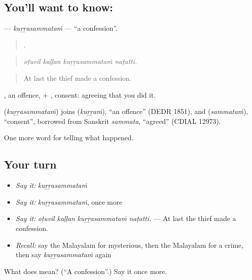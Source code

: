 \subsection*{You'll want to know: }
\textbf{} — \emph{kuṟṟasammataṁ} — \textquotedblleft{}a confession\textquotedblright{}.

\begin{quote}
   .
\end{quote}

\begin{quote}
\emph{oṭuvil kaḷḷan kuṟṟasammataṁ naṭatti.}
\end{quote}

\begin{quote}
At last the thief made a confession.
\end{quote}

, an offence, + , consent: agreeing that you did it.

\begin{cousinweb}
\textbf{} (\emph{kuṟṟasammataṁ}) joins  (\emph{kuṟṟaṁ}), \textquotedblleft{}an offence\textquotedblright{} (DEDR 1851), and  (\emph{sammataṁ}), \textquotedblleft{}consent\textquotedblright{}, borrowed from Sanskrit \emph{sammata}, \textquotedblleft{}agreed\textquotedblright{} (CDIAL 12973).
\end{cousinweb}

\begin{grammarlens}[title={What you've built}]
One more word for telling what happened.
\end{grammarlens}

\subsection*{Your turn}
\begin{itemize}
\raggedright
  \item \emph{Say it:} \emph{kuṟṟasammataṁ}
  \item \emph{Say it:} \emph{kuṟṟasammataṁ}, once more
  \item \emph{Say it:} \emph{oṭuvil kaḷḷan kuṟṟasammataṁ naṭatti.} — At last the thief made a confession.
  \item \emph{Recall:} say the Malayalam for mysterious, then the Malayalam for a crime, then say \emph{kuṟṟasammataṁ} again
\end{itemize}

\begin{tcolorbox}[breakable,colback=teal!4,colframe=teal!35!black,title={Before you move on}]
What does  mean? (\textquotedblleft{}A confession\textquotedblright{}.) Say it once more.
\end{tcolorbox}
